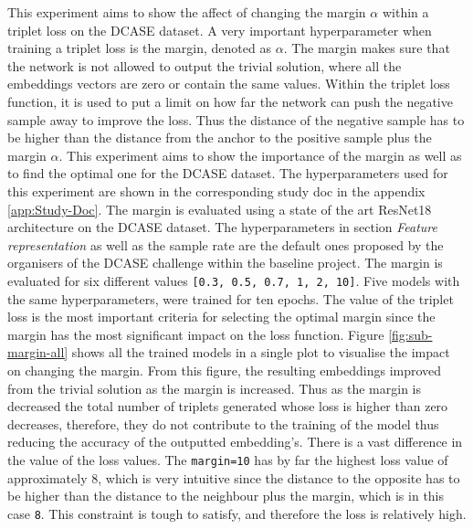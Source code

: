 \noindent
This experiment aims to show the affect of changing the margin $\alpha$ within a triplet loss on the DCASE dataset. A very important hyperparameter when training a triplet loss is the margin, denoted as $\alpha$. The margin makes sure that the network is not allowed to output the trivial solution, where all the embeddings vectors are zero or contain the same values. Within the triplet loss function, it is used to put a limit on how far the network can push the negative sample away to improve the loss. Thus the distance of the negative sample has to be higher than the distance from the anchor to the positive sample plus the margin $\alpha$. This experiment aims to show the importance of the margin as well as to find the optimal one for the DCASE dataset.
\newline
\newline
The hyperparameters used for this experiment are shown in the corresponding study doc in the appendix \ref{app:Study-Doc}. The margin is evaluated using a state of the art ResNet18 architecture on the DCASE dataset. The hyperparameters in section \textit{Feature representation} as well as the sample rate are the default ones proposed by the organisers of the DCASE challenge within the baseline project. The margin is evaluated for six different values \texttt{[0.3, 0.5, 0.7, 1, 2, 10]}.
\newline
\newline
Five models with the same hyperparameters, were trained for ten epochs. The value of the triplet loss is the most important criteria for selecting the optimal margin since the margin has the most significant impact on the loss function. Figure \ref{fig:sub-margin-all} shows all the trained models in a single plot to visualise the impact on changing the margin. From this figure, the resulting embeddings improved from the trivial solution as the margin is increased. Thus as the margin is decreased the total number of triplets generated whose loss is higher than zero decreases, therefore, they do not contribute to the training of the model thus reducing the accuracy of the outputted embedding’s.
\newline
\newline
There is a vast difference in the value of the loss values. The \texttt{margin=10} has by far the highest loss value of approximately 8, which is very intuitive since the distance to the opposite has to be higher than the distance to the neighbour plus the margin, which is in this case \texttt{8}. This constraint is tough to satisfy, and therefore the loss is relatively high.
